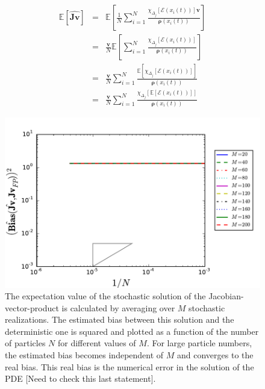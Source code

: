 \documentclass[]{article}
\newcommand{\E}{\ensuremath{\mathbb{E}}}
\newcommand{\U}{\ensuremath{\boldsymbol{\rho}}}
\newcommand{\cts}{\ensuremath{\boldsymbol{\Phi}_T}} %
\newcommand{\V}{\ensuremath{\mathbf{v}}}
\newcommand{\jv}{\ensuremath{\mathbf{\hat{Jv}}}}
\begin{document}
\begin{eqnarray}
\E[\jv] &=&  \E \left[  \frac{1}{N}\sum_{i=1}^{N}   \frac{ \chi_{\Delta_j} \left[  \mathcal{E} (x_i(t)) \right] \V}  {\U(x_i(t))}     \right] \\
		&=&   \frac{\V}{N} \E \left[  \sum_{i=1}^{N}   \frac{ \chi_{\Delta_j} \left[  \mathcal{E} (x_i(t)) \right] }  {\U(x_i(t))}     \right] \\
		&=&  \frac{\V}{N}  \sum_{i=1}^{N}   \frac{  \E \left[  \chi_{\Delta_j} \left[  \mathcal{E} (x_i(t)) \right]  \right] }  {\U(x_i(t))} \\
		&=& \frac{\V}{N}  \sum_{i=1}^{N}   \frac{  \chi_{\Delta_j} \left[  \E \left[   \mathcal{E} (x_i(t)) \right]  \right] }  {\U(x_i(t))} 
\end{eqnarray}




\begin{figure}
\includegraphics[width=14.5cm]{../Problems/WeightedParticles/checkSystem/plots/Bias_Jv_N_M.pdf}
\caption{The expectation value of the stochastic solution of the Jacobian-vector-product is calculated by averaging over $M$ stochastic realizations. The estimated bias between this solution and the deterministic one is squared and plotted as a function of the number of particles $N$ for different values of $M$.  For large particle numbers, the estimated bias becomes independent of $M$ and converges to the real bias. This real bias is the numerical error in the solution of the PDE [Need to check this last statement].}
\label{Bias_Jv_N_M}
\end{figure}
\end{document}
